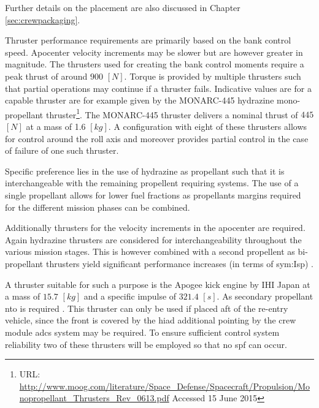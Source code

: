 Further details on the placement are also discussed in Chapter \ref{sec:crewpackaging}.

Thruster performance requirements are primarily based on the bank control speed. Apocenter velocity increments may be slower but are however greater in magnitude. The thrusters used for creating the bank control moments require a peak thrust of around $900$ $[N]$. Torque is provided by multiple thrusters such that partial operations may continue if a thruster fails.
Indicative values are for a capable thruster are for example given by the  MONARC-445 hydrazine mono-propellant thruster\footnote{URL: \url{http://www.moog.com/literature/Space\_Defense/Spacecraft/Propulsion/Monopropellant\_Thrusters\_Rev\_0613.pdf} Accessed 15 June 2015}. The MONARC-445 thruster delivers a nominal thrust of $445$ $[N]$ at a mass of 1.6 $[kg]$.  A configuration with eight of these thrusters allows for control around the roll axis and moreover provides partial control in the case of failure of one such thruster.
 
Specific preference lies in the use of hydrazine as propellant such that it is interchangeable with the remaining propellent requiring systems. The use of a single propellant allows for lower fuel fractions as propellants margins required for the different mission phases can be combined.

Additionally thrusters for the velocity increments in the apocenter are required. Again hydrazine thrusters are considered for interchangeability throughout the various mission stages. This is however combined with a second propellent as bi-propellant thrusters yield significant performance increases (in terms of \gls{sym:Isp}) \cite{Wertz2011}. 

A thruster suitable for such a purpose is the Apogee kick engine by IHI Japan at a mass of $15.7$ $[kg]$ and a specific impulse of $321.4$ $[s]$. As secondary propellant \gls{nto} is required \cite[p.538]{Wertz2011}. This thruster can only be used if placed aft of the re-entry vehicle, since the front is covered by the \gls{hiad} additional pointing by the crew module \gls{adcs} system may be required. To ensure sufficient control system reliability two of these thrusters will be employed so that no \acrfull{spf} can occur. 

